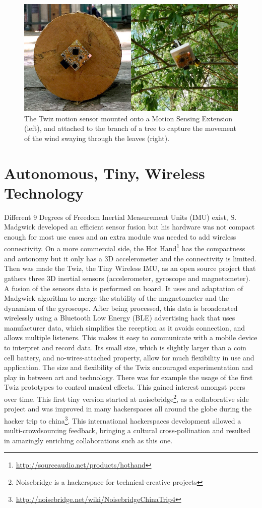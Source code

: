 \documentclass{sigchi}
\begin{document}
\begin{figure}[H]
\centering
\includegraphics[width=\columnwidth]{pics/fieldtrip}
\caption{The Twiz motion sensor mounted onto a Motion
Sensing Extension (left), and attached to the branch of
a tree to capture the movement of the wind swaying through
the leaves (right).}
\label{fig:fieldtrip}
\end{figure}

\section{Autonomous, Tiny, Wireless Technology}

Different 9 Degrees of Freedom Inertial Measurement Units
(IMU) exist, S. Madgwick\cite {madgwick} developed an
efficient sensor fusion but his hardware was not compact
enough for most use cases and an extra module was needed
to add wireless connectivity.
On a more commercial side, the Hot Hand\footnote
{\url{http://sourceaudio.net/products/hothand}} has the compactness
and autonomy but it only has a 3D accelerometer and the
connectivity is limited.
Then was made the Twiz, the Tiny Wireless IMU, as an open
source project that gathers three 3D inertial sensors
(accelerometer, gyroscope and magnetometer).
A fusion of the sensors data is performed on board.
It uses and adaptation of Madgwick algorithm to
merge the stability of the magnetometer and the
dynamism of the gyroscope. After being processed, this
data is broadcasted wirelessly using a Bluetooth Low
Energy (BLE) advertising hack that uses manufacturer
data, which simplifies the reception as it avoids
connection, and allows multiple listeners. This makes it
easy to communicate with a mobile device to interpret
and record data. Its small size, which is slightly larger
than a coin cell battery, and no-wires-attached
property, allow for much flexibility in use and
application.
The size and flexibility of the Twiz encouraged
experimentation and play in between art and
technology. There was for example the usage of the
first Twiz prototypes to control musical effects. This
gained interest amongst peers over time. This first tiny
version started at noisebridge\footnote{Noisebridge is a
hackerspace for technical-creative projects}, as a collaborative
side project and was improved in many hackerspaces all
around the globe during the hacker trip to china\footnote
{\url{http://noisebridge.net/wiki/NoisebridgeChinaTrip4}}.
This international hackerspaces development allowed a
multi-crowdsourcing feedback, bringing a cultural
cross-pollination and resulted in amazingly enriching
collaborations such as this one.
\end{document}
